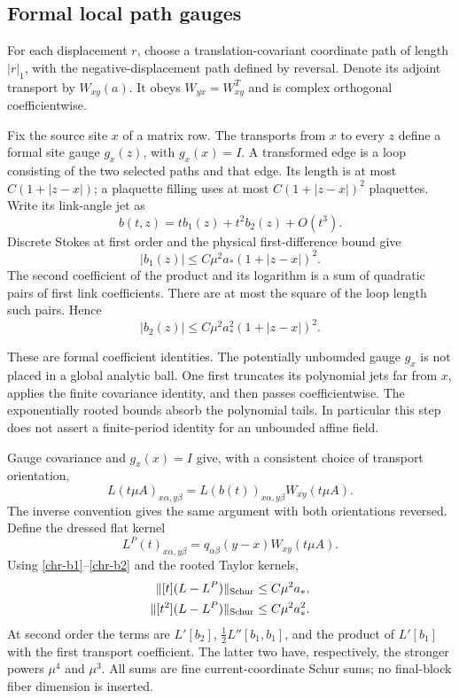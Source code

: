 \documentclass[11pt]{article}
\theoremstyle{remark}
\begin{document}
\subsection{Formal local path gauges}
\label{chr-local-gauge}

For each displacement \(r\), choose a translation-covariant
coordinate path of length \(|r|_1\), with the negative-displacement
path defined by reversal.  Denote its adjoint transport by
\(W_{xy}(a)\).  It obeys \(W_{yx}=W_{xy}^T\) and is complex
orthogonal coefficientwise.

Fix the source site \(x\) of a matrix row.  The transports from \(x\)
to every \(z\) define a formal site gauge \(g_x(z)\), with
\(g_x(x)=I\).  A transformed edge is a loop consisting of the two
selected paths and that edge.  Its length is at most
\(C(1+|z-x|)\); a plaquette filling uses at most
\(C(1+|z-x|)^2\) plaquettes.  Write its link-angle jet as
\[
 b(t,z)=t b_1(z)+t^2b_2(z)+O(t^3).
\]
Discrete Stokes at first order and the physical first-difference
bound give
\begin{equation}
 |b_1(z)|\leq C\mu^2a_*(1+|z-x|)^2.
 \label{chr-b1}
\end{equation}
The second coefficient of the product and its logarithm is a sum
of quadratic pairs of first link coefficients.  There are at most
the square of the loop length such pairs.  Hence
\begin{equation}
 |b_2(z)|\leq C\mu^2a_*^2(1+|z-x|)^2.
 \label{chr-b2}
\end{equation}

These are formal coefficient identities.  The potentially
unbounded gauge \(g_x\) is not placed in a global analytic ball.
One first truncates its polynomial jets far from \(x\), applies
the finite covariance identity, and then passes coefficientwise.
The exponentially rooted bounds absorb the polynomial tails.
In particular this step does not assert a finite-period identity
for an unbounded affine field.

Gauge covariance and \(g_x(x)=I\) give, with a consistent choice
of transport orientation,
\begin{equation}
 L(t\mu A)_{x\alpha,y\beta}
        =L(b(t))_{x\alpha,y\beta}W_{xy}(t\mu A).
 \label{chr-gauge-identity}
\end{equation}
The inverse convention gives the same argument with both
orientations reversed.  Define the dressed flat kernel
\[
 L^P(t)_{x\alpha,y\beta}
     =q_{\alpha\beta}(y-x)W_{xy}(t\mu A).
\]
Using \eqref{chr-b1}--\eqref{chr-b2} and the rooted Taylor kernels,
\begin{align}
 \|[t](L-L^P)\|_{\mathrm{Schur}}
     &\leq C\mu^2a_*,
 \notag\\
 \|[t^2](L-L^P)\|_{\mathrm{Schur}}
     &\leq C\mu^2a_*^2 .
 \label{chr-peierls-error}
\end{align}
At second order the terms are \(L'[b_2]\),
\(\frac12L''[b_1,b_1]\), and the product of \(L'[b_1]\)
with the first transport coefficient.  The latter two have,
respectively, the stronger powers \(\mu^4\) and \(\mu^3\).
All sums are fine current-coordinate Schur sums; no final-block
fiber dimension is inserted.
\end{document}
